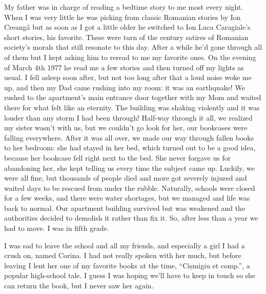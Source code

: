 \documentclass[12pt]{book}
\begin{document}
My father was in charge of reading a bedtime story to me most every
night. When I was very little he was picking from classic Romanian
stories by Ion Creangǎ but as soon as I got a little older he switched
to Ion Luca Caragiale's short stories, his favorite. These were turn of
the century satires of Romanian society's morals that still resonate to
this day. After a while he'd gone through all of them but I kept asking
him to reread to me my favorite ones. On the evening of March 4th 1977
he read me a few stories and then turned off my lights as usual. I fell
asleep soon after, but not too long after that a loud noise woke me up,
and then my Dad came rushing into my room: it was an earthquake! We
rushed to the apartment's main entrance door together with my Mom and
waited there for what felt like an eternity. The building was shaking
violently and it was louder than any storm I had been through! Half-way
through it all, we realized my sister wasn't with us, but we couldn't go
look for her, our bookcases were falling everywhere. After it was all
over, we made our way through fallen books to her bedroom: she had
stayed in her bed, which turned out to be a good idea, because her
bookcase fell right next to the bed. She never forgave us for abandoning
her, she kept telling us every time the subject came up. Luckily, we
were all fine, but thousands of people died and more got severely
injured and waited days to be rescued from under the rubble. Naturally,
schools were closed for a few weeks, and there were water shortages, but
we managed and life was back to normal. Our apartment building survived
but was weakened and the authorities decided to demolish it rather than
fix it. So, after less than a year we had to move. I was in fifth grade.

I was sad to leave the school and all my friends, and especially a girl
I had a crush on, named Corina. I had not really spoken with her much,
but before leaving I lent her one of my favorite books at the time,
``Cișmigiu et comp.'', a popular high-school tale. I guess I was hoping
we'll have to keep in touch so she can return the book, but I never saw
her again.
\end{document}
